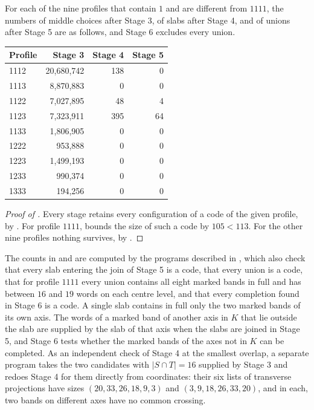 \documentclass[11pt,colorlinks]{charlie}
\begin{document}
\begin{lemma}\label{lem:mixedadj}
For each of the nine profiles that contain $1$ and are different from $1111$, the numbers of middle choices after Stage 3, of slabs after Stage 4, and of unions after Stage 5 are as follows, and Stage 6 excludes every union.
\begin{center}\small
\begin{tabular}{@{}lrrr@{}}
\toprule
Profile & Stage 3 & Stage 4 & Stage 5\\\midrule
1112 & 20{,}680{,}742 & 138 & 0\\
1113 & 8{,}870{,}883 & 0 & 0\\
1122 & 7{,}027{,}895 & 48 & 4\\
1123 & 7{,}323{,}911 & 395 & 64\\
1133 & 1{,}806{,}905 & 0 & 0\\
1222 & 953{,}888 & 0 & 0\\
1223 & 1{,}499{,}193 & 0 & 0\\
1233 & 990{,}374 & 0 & 0\\
1333 & 194{,}256 & 0 & 0\\
\bottomrule
\end{tabular}
\end{center}
\end{lemma}

\begin{proof}[Proof of ]
Every stage retains every configuration of a code of the given profile, by . For profile $1111$,  bounds the size of such a code by $105<113$. For the other nine profiles nothing survives, by .
\end{proof}

The counts in  and  are computed by the programs described in , which also check that every slab entering the join of Stage 5 is a code, that every union is a code, that for profile $1111$ every union contains all eight marked bands in full and has between $16$ and $19$ words on each centre level, and that every completion found in Stage 6 is a code. A single slab contains in full only the two marked bands of its own axis. The words of a marked band of another axis in $K$ that lie outside the slab are supplied by the slab of that axis when the slabs are joined in Stage 5, and Stage 6 tests whether the marked bands of the axes not in $K$ can be completed. As an independent check of Stage 4 at the smallest overlap, a separate program takes the two candidates with $|S\cap T|=16$ supplied by Stage 3 and redoes Stage 4 for them directly from coordinates: their six lists of transverse projections have sizes $(20,33,26,18,9,3)$ and $(3,9,18,26,33,20)$, and in each, two bands on different axes have no common crossing.
\end{document}
